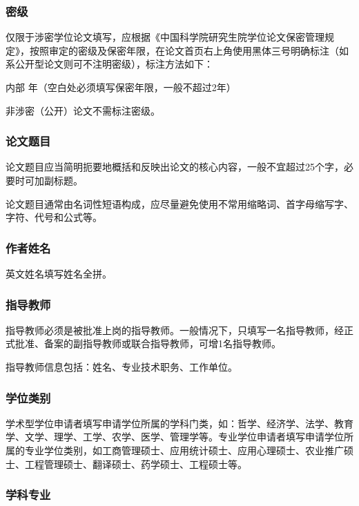 \documentclass[a4paper,12pt,oneside,openany]{book}
\begin{document}
\begin{CJK}{UTF8}{hei}
\subsubsection{密级}

仅限于涉密学位论文填写，应根据《中国科学院研究生院学位论文保密管理规定》，按照审定的密级及保密年限，在论文首页右上角使用黑体三号明确标注（如系公开型论文则可不注明密级），标注方法如下：

内部 年（空白处必须填写保密年限，一般不超过2年）



非涉密（公开）论文不需标注密级。 


\subsubsection{论文题目}

论文题目应当简明扼要地概括和反映出论文的核心内容，一般不宜超过25个字，必要时可加副标题。

论文题目通常由名词性短语构成，应尽量避免使用不常用缩略词、首字母缩写字、字符、代号和公式等。 


\subsubsection{作者姓名}

英文姓名填写姓名全拼。


\subsubsection{指导教师}

指导教师必须是被批准上岗的指导教师。一般情况下，只填写一名指导教师，经正式批准、备案的副指导教师或联合指导教师，可增1名指导教师。

指导教师信息包括：姓名、专业技术职务、工作单位。 


\subsubsection{学位类别}

学术型学位申请者填写申请学位所属的学科门类，如：哲学、经济学、法学、教育学、文学、理学、工学、农学、医学、管理学等。专业学位申请者填写申请学位所属的专业学位类别，如工商管理硕士、应用统计硕士、应用心理硕士、农业推广硕士、工程管理硕士、翻译硕士、药学硕士、工程硕士等。


\subsubsection{学科专业}


\end{CJK}
\end{document}
